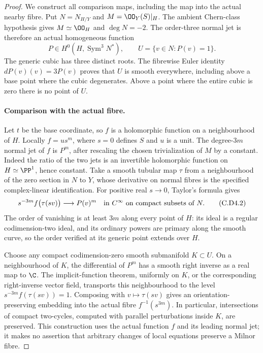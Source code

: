 \begin{proof}
We construct all comparison maps, including the map into the
actual nearby fibre. Put $N=N_{H/Y}$ and
$M=\OO_Y(S)|_H$. The ambient Chern-class hypothesis gives
$M\simeq\OO_H$ and $\deg N=-2$. The order-three normal jet is
therefore an actual homogeneous function
\[
 P\in H^0(H,\operatorname{Sym}^3N^*),\qquad
 U=\{v\in N:P(v)=1\}.
\tag{C.D4.1}
\]
The generic cubic has three distinct roots. The fibrewise Euler
identity $dP(v)(v)=3P(v)$ proves that $U$ is smooth everywhere,
including above a base point where the cubic degenerates. Above
a point where the entire cubic is zero there is no point of $U$.

\paragraph{Comparison with the actual fibre.}
Let $t$ be the base coordinate, so $f$ is a holomorphic function
on a neighbourhood of $H$. Locally $f=u s^m$, where $s=0$
defines $S$ and $u$ is a unit. The degree-$3m$ normal jet of
$f$ is $P^m$, after rescaling the chosen trivialization of $M$
by a constant. Indeed the ratio of the two jets is an invertible
holomorphic function on $H\simeq\PP^1$, hence constant.
Take a smooth tubular map $\tau$ from a neighbourhood of the
zero section in $N$ to $Y$, whose derivative on normal fibres
is the specified complex-linear identification. For positive
real $s\to0$, Taylor's formula gives
\[
 s^{-3m}f\bigl(\tau(sv)\bigr)\longrightarrow P(v)^m
                 \quad\hbox{in }C^\infty\hbox{ on compact subsets of }N.
\tag{C.D4.2}
\]
The order of vanishing is at least $3m$ along every point of
$H$: its ideal is a regular codimension-two ideal, and its
ordinary powers are primary along the smooth curve, so the
order verified at its generic point extends over $H$.

Choose any compact codimension-zero smooth submanifold
$K\subset U$. On a neighbourhood of $K$, the differential of
$P^m$ has a smooth right inverse as a real map to $\C$.
The implicit-function theorem, uniformly on $K$, or the
corresponding right-inverse vector field, transports this
neighbourhood to the level
$s^{-3m}f(\tau(sv))=1$. Composing with $v\mapsto\tau(sv)$
gives an orientation-preserving embedding into the actual
fibre $f^{-1}(s^{3m})$. In particular, intersections of compact
two-cycles, computed with parallel perturbations inside $K$,
are preserved. This construction uses the actual function
$f$ and its leading normal jet; it makes no assertion that
arbitrary changes of local equations preserve a Milnor fibre.


\end{proof}
